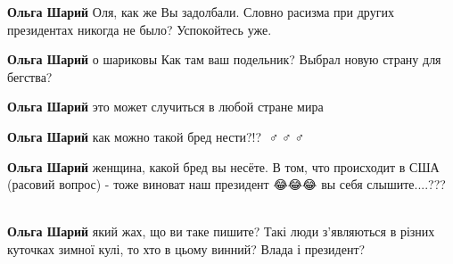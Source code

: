 \begin{itemize}
\begin{itemize}
\textbf{Ольга Шарий} Оля, как же Вы задолбали. Словно расизма при других президентах никогда не было? Успокойтесь уже.

 
\textbf{Ольга Шарий} о шариковы
Как там ваш подельник? Выбрал новую страну для бегства?

 
\textbf{Ольга Шарий} это может случиться в любой стране мира

 
\textbf{Ольга Шарий} как можно такой бред нести?!? 🤦♂️🤦♂️🤦♂️

 
\textbf{Ольга Шарий} женщина, какой бред вы несёте. В том, что происходит в США (расовий вопрос) - тоже виноват наш президент 😂😂😂 вы себя слышите....??? 🙈🙉🙊

 
\textbf{Ольга Шарий} який жах, що ви таке пишите? Такі люди з'являються в різних куточках зимної кулі, то хто в цьому винний? Влада і президент?

 

\end{itemize}
\end{itemize}
